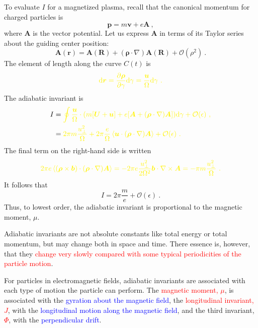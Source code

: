\documentclass[12pt,a4paper]{article}
\renewcommand{\vec}[1]{\boldsymbol{#1}}
\newcommand{\dif}{\mathrm{d}}
\begin{document}
To evaluate $I$ for a magnetized plasma, recall that the canonical momentum for charged particles is
\begin{equation}
\vec{p} = m \vec{v} + e \vec{A} ~,
\end{equation}
where $\vec{A}$ is the vector potential. Let us express $\vec{A}$ in terms of its Taylor series about the guiding center position:
\begin{equation}
\vec{A}(\vec{r}) = \vec{A}(\vec{R}) +(\vec{\rho}\cdot \nabla) \vec{A}(\vec{R}) +\mathcal O(\rho^2) ~.
\end{equation}
The element of length along the curve $C(t)$ is
\begin{equation}
\color{yellow} \dif \vec{r} = \dfrac{\partial \vec{\rho}}{\partial \gamma} \dif \gamma = \dfrac{\vec{u}}{\Omega} \dif \gamma ~.
\end{equation}
The adiabatic invariant is
\begin{align}
\nonumber  I &= \color{yellow}  \oint \dfrac{\vec{u}}{\Omega} \cdot (m[\vec{U} +\vec{u}] +e[\vec{A} +(\vec{\rho}\cdot \nabla) \vec{A}]) \dif \gamma +\mathcal O(\epsilon) ~, \\
&= \color{yellow}  2\pi m \dfrac{u_\perp^2}{\Omega} + 2\pi \dfrac{e}{\Omega} \left\langle \vec{u} \cdot (\vec{\rho}\cdot \nabla) \vec{A} \right\rangle +\mathcal O(\epsilon) ~.
\end{align}
The final term on the right-hand side is written
\begin{equation}
\color{yellow}  2\pi e \left\langle (\vec{\rho}\times\vec{b})  \cdot (\vec{\rho}\cdot \nabla) \vec{A} \right\rangle = -2\pi e \dfrac{u_\perp^2}{2 \Omega^2} \vec{b} \cdot \nabla \times \vec{A} = -\pi m \dfrac{u_\perp^2}{\Omega} ~.
\end{equation}
It follows that
\begin{equation}
I = 2\pi \dfrac{m}{e} + \mathcal O(\epsilon) ~.
\end{equation}
Thus, to lowest order, the adiabatic invariant is proportional to the magnetic moment, $\mu$. 



\cite{1996bspp.book.....B} Adiabatic invariants are not absolute constants like total energy or total momentum, but may change both in space and time. There essence is, however, that they \textcolor{red}{change very slowly compared with some typical periodicities of the particle motion}.

For particles in electromagnetic fields, adiabatic invariants are associated with each type of motion the particle can perform. The \textcolor{red}{magnetic moment, $\mu$}, is associated with the \textcolor{blue}{gyration about the magnetic field}, the \textcolor{red}{longitudinal invariant, $J$}, with the \textcolor{blue}{longitudinal motion along the magnetic field}, and the third invariant, \textcolor{red}{$\Phi$}, with the \textcolor{blue}{perpendicular drift}. 
\end{document}
